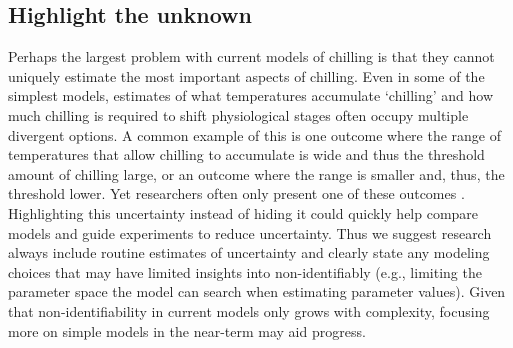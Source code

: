 \documentclass[11pt]{article}
\begin{document}
\subsection*{Highlight the unknown} 
Perhaps the largest problem with current models of chilling is that they cannot uniquely estimate the most important aspects of chilling. Even in some of the simplest models, estimates of what temperatures accumulate `chilling' and how much chilling is required to shift physiological stages often occupy multiple divergent options. A common example of this is one outcome where the range of temperatures that allow chilling to accumulate is wide and thus the threshold amount of chilling large, or an outcome where the range is smaller and, thus, the threshold lower. Yet researchers often only present one of these outcomes \citep{chuine2016}. Highlighting this uncertainty instead of hiding it could quickly help compare models and guide experiments to reduce uncertainty. Thus we suggest research always include routine estimates of uncertainty and clearly state any modeling choices that may have limited insights into non-identifiably (e.g., limiting the parameter space the model can search when estimating parameter values). Given that non-identifiability in current models only grows with complexity, focusing more on simple models in the near-term may aid progress.

\end{document}
